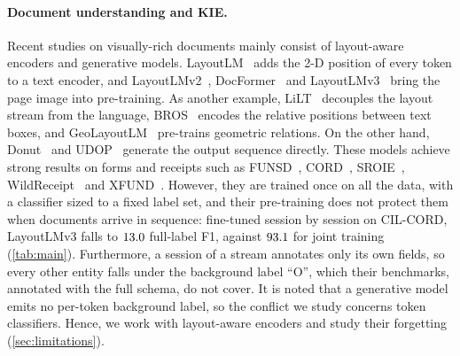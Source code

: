\documentclass[10pt,twocolumn,letterpaper]{article}
\begin{document}
\paragraph{Document understanding and KIE.} Recent studies on visually-rich documents mainly consist of layout-aware encoders and generative models. LayoutLM~\citep{xu2020layoutlm} adds the 2-D position of every token to a text encoder, and LayoutLMv2~\citep{xu2021layoutlmv2}, DocFormer~\citep{appalaraju2021docformer} and LayoutLMv3~\citep{huang2022layoutlmv3} bring the page image into pre-training. As another example, LiLT~\citep{wang2022lilt} decouples the layout stream from the language, BROS~\citep{hong2022bros} encodes the relative positions between text boxes, and GeoLayoutLM~\citep{luo2023geolayoutlm} pre-trains geometric relations. On the other hand, Donut~\citep{kim2022donut} and UDOP~\citep{tang2023udop} generate the output sequence directly. These models achieve strong results on forms and receipts such as FUNSD~\citep{jaume2019funsd}, CORD~\citep{park2019cord}, SROIE~\citep{huang2019sroie}, WildReceipt~\citep{sun2021sdmgr} and XFUND~\citep{xu2022xfund}. However, they are trained once on all the data, with a classifier sized to a fixed label set, and their pre-training does not protect them when documents arrive in sequence: fine-tuned session by session on CIL-CORD, LayoutLMv3 falls to $13.0$ full-label F1, against $93.1$ for joint training (\cref{tab:main}). Furthermore, a session of a stream annotates only its own fields, so every other entity falls under the background label ``O'', which their benchmarks, annotated with the full schema, do not cover. It is noted that a generative model emits no per-token background label, so the conflict we study concerns token classifiers. Hence, we work with layout-aware encoders and study their forgetting (\cref{sec:limitations}).
\end{document}
